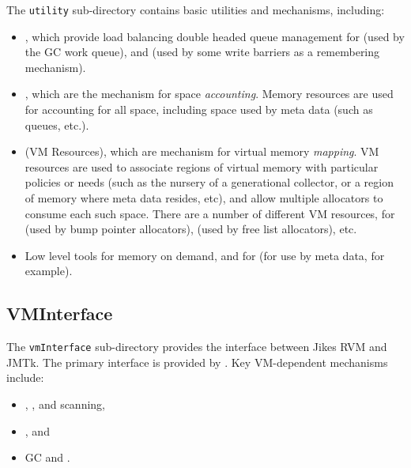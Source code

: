 The \texttt{utility} sub-directory contains basic utilities and
mechanisms, including:
\begin{itemize}
\item {}, which provide load balancing double
  headed queue management for  (used by the GC work queue), and
   (used by some write
  barriers as a remembering mechanism).
\item {}, which are the
  mechanism for space \emph{accounting}.  Memory resources are used
  for accounting for all space, including space used by meta data
  (such as queues, etc.).
\item {} (VM
  Resources), which are mechanism for virtual memory \emph{mapping}.
  VM resources are used to associate regions of virtual memory with
  particular policies or needs (such as the nursery of a generational
  collector, or a region of memory where meta data resides, etc), and
  allow multiple allocators to consume each such space. There are a
  number of different VM resources, for  (used by bump pointer
  allocators), 
  (used by free list allocators), etc.
\item Low level tools for 
  memory on demand, and for  (for use by meta data, for example).
\end{itemize}

\subsection{VMInterface} \label{sssec:vminterface}

The \texttt{vmInterface} sub-directory provides the interface between
Jikes RVM and JMTk.  The primary interface is provided by
.  Key
VM-dependent mechanisms include:

\begin{itemize}
\item {},
  , and
   scanning,
\item {}, and
\item GC  and .
\end{itemize}

